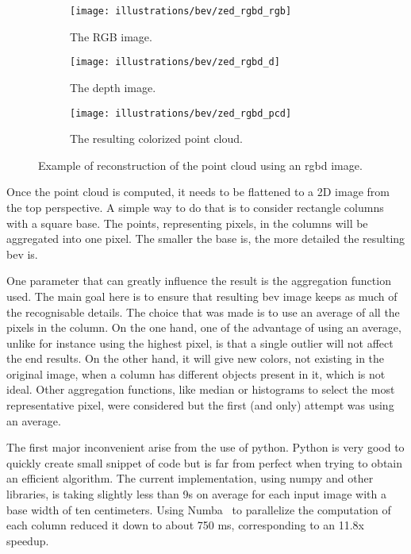 \begin{figure}[ht!]
    \centering
    \begin{subfigure}[t]{0.32\textwidth}
        \centering
        \texttt{[image: illustrations/bev/zed\_rgbd\_rgb]}
        \caption{The RGB image.}
        \label{fig:pcd_rgbd:rgb}
    \end{subfigure}
    \hfill
    \begin{subfigure}[t]{0.32\textwidth}
        \centering
        \texttt{[image: illustrations/bev/zed\_rgbd\_d]}
        \caption{The depth image.}
        \label{fig:pcd_rgbd:depth}
    \end{subfigure}
    \hfill
    \begin{subfigure}[t]{0.32\textwidth}
        \centering
        \texttt{[image: illustrations/bev/zed\_rgbd\_pcd]}
        \caption{The resulting colorized point cloud.}
        \label{fig:pcd_rgbd:pcd}
    \end{subfigure}
    \caption{Example of reconstruction of the point cloud using an \gls{rgbd} image.}
    \label{fig:pcd_rgbd:pcd_construction}
\end{figure}

Once the point cloud is computed, it needs to be flattened to a 2D image from the top perspective.
A simple way to do that is to consider rectangle columns with a square base.
The points, representing pixels, in the columns will be aggregated into one pixel.
The smaller the base is, the more detailed the resulting \gls{bev} is.

One parameter that can greatly influence the result is the aggregation function used.
The main goal here is to ensure that resulting \gls{bev} image keeps as much of the recognisable details.
The choice that was made is to use an average of all the pixels in the column.
On the one hand, one of the advantage of using an average, unlike for instance using the highest pixel, is that a single outlier will not affect the end results.
On the other hand, it will give new colors, not existing in the original image, when a column has different objects present in it, which is not ideal.
Other aggregation functions, like median or histograms to select the most representative pixel, were considered but the first (and only)
attempt was using an average.

The first major inconvenient arise from the use of python.
Python is very good to quickly create small snippet of code but is far from perfect when trying to obtain an efficient algorithm.
The current implementation, using numpy and other libraries, is taking slightly less than 9s on average for each input image with a base width of ten centimeters.
Using Numba~\cite{lam_numba_2015} to parallelize the computation of each column reduced it down to about 750 ms, corresponding to an 11.8x speedup.

